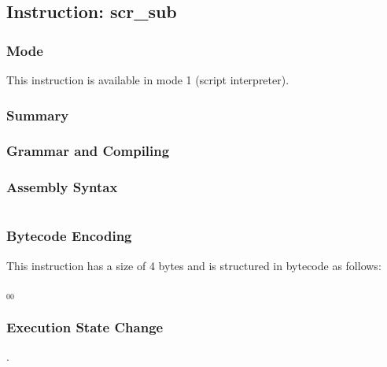 \subsection{Instruction: scr\_sub}

\subsubsection{Mode}
This instruction is available in mode 1 (script interpreter).
\subsubsection{Summary}


\subsubsection{Grammar and Compiling}


\subsubsection{Assembly Syntax}

\begin{myquote}
\begin{verbatim}

\end{verbatim}
\end{myquote}

\subsubsection{Bytecode Encoding}

This instruction has a size of 4 bytes and is structured in bytecode as follows:

$_{00}$\ 

\subsubsection{Execution State Change}

.


